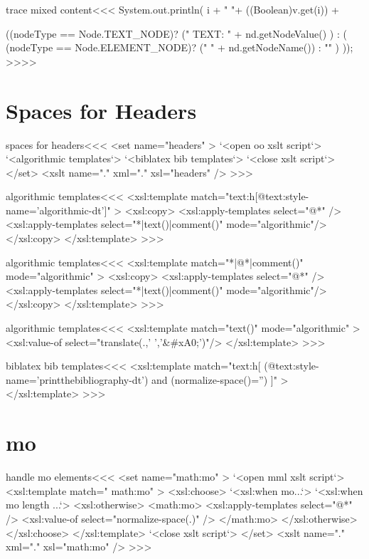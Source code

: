 \documentclass{article}
\begin{document}
\<trace mixed content\><<<
System.out.println(
i + "     "+  ((Boolean)v.get(i))
+

((nodeType == Node.TEXT_NODE)? 
    ("  TEXT: " + nd.getNodeValue() )
   : 
(
(nodeType == Node.ELEMENT_NODE)? 
     ("  " + nd.getNodeName())
     :
     ""
)
));
>>>>







\section{Spaces for Headers}

\<spaces for headers\><<<
<set name="headers" >
   `<open oo xslt script`>
   `<algorithmic templates`>
   `<biblatex bib templates`>
   `<close xslt script`>
</set>
<xslt name="." xml="." xsl="headers" />
>>>

\<algorithmic templates\><<<
<xsl:template match="text:h[@text:style-name='algorithmic-dt']" >
  <xsl:copy>
      <xsl:apply-templates select="@*" />
      <xsl:apply-templates select="*|text()|comment()" mode="algorithmic"/>
  </xsl:copy>
</xsl:template> 
>>>


\<algorithmic templates\><<<
<xsl:template match="*|@*|comment()" mode="algorithmic" >
  <xsl:copy>
      <xsl:apply-templates select="@*" />
      <xsl:apply-templates select="*|text()|comment()" mode="algorithmic"/>
  </xsl:copy>
</xsl:template> 
>>>



\<algorithmic templates\><<<
<xsl:template match="text()" mode="algorithmic" >
   <xsl:value-of select="translate(.,' ','&#xA0;')"/>
</xsl:template> 
>>>


\<biblatex bib templates\><<<
<xsl:template match="text:h[
     (@text:style-name='printthebibliography-dt')
     and
     (normalize-space()='')
]" >
</xsl:template> 
>>>


\section{mo}

\<handle mo elements\><<<
<set name="math:mo" >
   `<open mml xslt script`>
   <xsl:template match=" math:mo" >
   <xsl:choose>
     `<xsl:when mo...`>
     `<xsl:when mo length ...`>
     <xsl:otherwise>
        <math:mo>
           <xsl:apply-templates select="@*" />
           <xsl:value-of select="normalize-space(.)" />
        </math:mo>
     </xsl:otherwise>
   </xsl:choose>
   </xsl:template> 
   `<close xslt script`>
</set>
<xslt name="." xml="." xsl="math:mo" />
>>>
\end{document}
